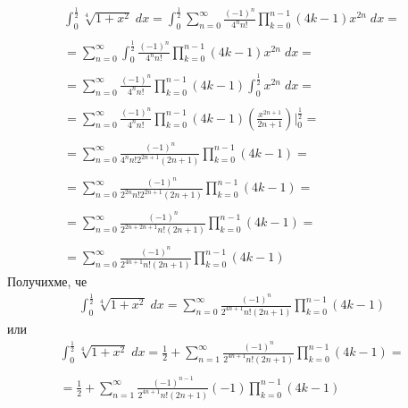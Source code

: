 \documentclass[a4paper,14pt]{extarticle}
\begin{document}
\begin{align*}
    \displaystyle\int_0^{\frac{1}{2}} \sqrt[4]{1 + x^2} \; dx = \displaystyle\int_0^{\frac{1}{2}} \displaystyle\sum_{n = 0}^{\infty} \frac{(-1)^{n}}{4^n n!}\displaystyle\prod_{k = 0}^{n - 1}(4k - 1) x^{2n} \; dx = \\\\
    = \displaystyle\sum_{n = 0}^{\infty} \displaystyle\int_0^{\frac{1}{2}} \frac{(-1)^{n}}{4^n n!}\displaystyle\prod_{k = 0}^{n - 1}(4k - 1) x^{2n} \; dx = \\\\
    = \displaystyle\sum_{n = 0}^{\infty} \frac{(-1)^{n}}{4^n n!}\displaystyle\prod_{k = 0}^{n - 1}(4k - 1) \displaystyle\int_0^{\frac{1}{2}} x^{2n} \; dx = \\\\
    = \displaystyle\sum_{n = 0}^{\infty} \frac{(-1)^{n}}{4^n n!}\displaystyle\prod_{k = 0}^{n - 1}(4k - 1) \left(\frac{x^{2n + 1}}{2n + 1}\right)\Bigg|_0^{\frac{1}{2}} = \\\\
    = \displaystyle\sum_{n = 0}^{\infty} \frac{(-1)^{n}}{4^n n! 2^{2n + 1} (2n + 1)}\displaystyle\prod_{k = 0}^{n - 1}(4k - 1) = \\\\
    = \displaystyle\sum_{n = 0}^{\infty} \frac{(-1)^{n}}{2^{2n} n! 2^{2n + 1} (2n + 1)}\displaystyle\prod_{k = 0}^{n - 1}(4k - 1) = \\\\
    = \displaystyle\sum_{n = 0}^{\infty} \frac{(-1)^{n}}{2^{2n + 2n + 1} n! (2n + 1)}\displaystyle\prod_{k = 0}^{n - 1}(4k - 1) = \\\\
    = \displaystyle\sum_{n = 0}^{\infty} \frac{(-1)^{n}}{2^{4n + 1} n! (2n + 1)}\displaystyle\prod_{k = 0}^{n - 1}(4k - 1)
\end{align*}
Получихме, че \begin{align*}
    \displaystyle\int_0^{\frac{1}{2}} \sqrt[4]{1 + x^2} \; dx = \displaystyle\sum_{n = 0}^{\infty} \frac{(-1)^{n}}{2^{4n + 1} n! (2n + 1)}\displaystyle\prod_{k = 0}^{n - 1}(4k - 1)
\end{align*}
или \begin{align*}
    \displaystyle\int_0^{\frac{1}{2}} \sqrt[4]{1 + x^2} \; dx = \frac{1}{2} + \displaystyle\sum_{n = 1}^{\infty} \frac{(-1)^{n}}{2^{4n + 1} n! (2n + 1)}\displaystyle\prod_{k = 0}^{n - 1}(4k - 1) = \\\\
    = \frac{1}{2} + \displaystyle\sum_{n = 1}^{\infty} \frac{(-1)^{n - 1}}{2^{4n + 1} n! (2n + 1)}(-1)\displaystyle\prod_{k = 0}^{n - 1}(4k - 1)
\end{align*}
\end{document}
